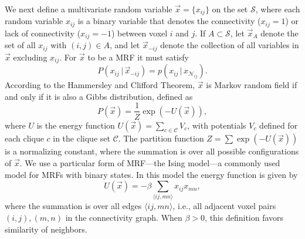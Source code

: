 \documentclass[12pt]{article}
\begin{document}
We next define a multivariate random variable $\vec x = \{ x_{ij} \}$ on the set
$\mathcal{S}$, where each random variable $x_{ij}$ is a binary variable that
denotes the connectivity ($x_{ij} = 1$) or lack of connectivity ($x_{ij} = -1$)
between voxel $i$ and $j$. If $A \subset \mathcal{S}$, let $\vec x_A$ denote the
set of all $x_{ij}$ with $(i,j) \in A$, and let $\vec x_{-ij}$ denote the
collection of all variables in $\vec x$ excluding $x_{ij}$. For $\vec x$ to be a
MRF it must satisfy
\begin{equation*}
  P( x_{ij} \, | \, \vec x_{-ij}) = p(x_{ij} \, | \, x_{\mathcal{N}_{ij}}).
\end{equation*}
According to the Hammersley and Clifford
Theorem\citep{besag_spatial_1974}, $\vec x$ is Markov random field if
and only if it is also a Gibbs distribution, defined as
\begin{equation}
  P(\vec x) = \frac{1}{Z}\exp\left(-U(\vec x)\right), \label{eq:Gibbs1}
\end{equation}
where $U$ is the energy function $U(\vec x) = \sum_{c \in \mathcal{C}}
V_c$, with potentials $V_c$ defined for each clique $c$ in the clique
set $\mathcal{C}$. The partition function $Z = \sum \exp(-U(\vec x))$
is a normalizing constant, where the summation is over all possible
configurations of $\vec x$. We use a particular form of MRF---the
Ising model---a commonly used model for MRFs with binary states. In
this model the energy function is given by
\begin{equation}
  U(\vec x) = - \beta \sum_{\langle ij, mn \rangle} x_{ij} x_{mn},
  \label{eq:A1}
\end{equation}
where the summation is over all edges $\langle ij, mn \rangle$, i.e., all
adjacent voxel pairs $(i,j), (m,n)$ in the connectivity graph. When $\beta > 0$,
this definition favors similarity of neighbors.
\end{document}
